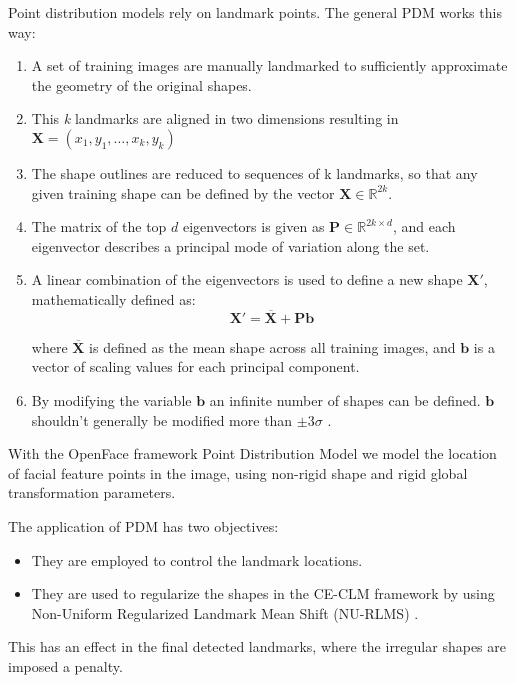 Point distribution models rely on landmark points. The general PDM works this way:
\begin{enumerate}
	\item A set of training images are manually landmarked to sufficiently approximate the geometry of the original shapes. 
	\item This \textit{k} landmarks are aligned in two dimensions resulting in \\
	$\mathbf{X} = (x_1,y_1, \dots, x_k, y_k)$
	\item The shape outlines are reduced to sequences of k landmarks, so that any given training shape can be defined by the vector $\mathbf{X} \in {\mathbb{R} ^{2k}}$.
	\item The matrix of the top $d$ eigenvectors is given as $\mathbf{P} \in \mathbb{R}^{2k \times d}$, and each eigenvector describes a principal mode of variation along the set.
	\item A linear combination of the eigenvectors is used to define a new shape $ \mathbf{X} '$, mathematically defined as: 
	\begin{equation}
	\mathbf {X}' = {\overline {\mathbf {X}} + \mathbf{P} \mathbf{b}}
	\end{equation}
	
	where $ {\overline {\mathbf {X}}}$ is defined as the mean shape across all training images, and $\mathbf {b}$ is a vector of scaling values for each principal component. 
	\item By modifying the variable $\mathbf {b}$  an infinite number of shapes can be defined. $\mathbf {b}$ shouldn't generally be modified more than $\pm3\sigma$ \cite{wiki:PDM}.
\end{enumerate}

With the OpenFace framework Point Distribution Model \cite{PDM_RLMS} we model the location of facial feature points in the image, using non-rigid shape and rigid global transformation parameters.

The application of PDM has two objectives:

\begin{itemize}
	\item They are employed to control the landmark locations.
	\item They are used to regularize the shapes in the CE-CLM framework by using Non-Uniform Regularized Landmark Mean Shift (NU-RLMS) \cite{Baltru2013}.
\end{itemize}
This has an effect in the final detected landmarks, where the irregular shapes are imposed a penalty.


